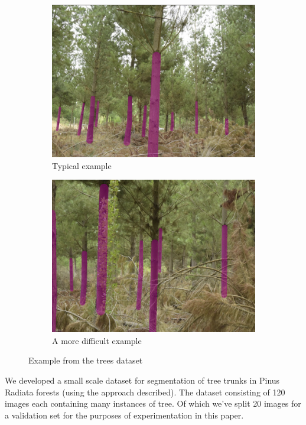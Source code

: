 \documentclass{article}
\begin{document}
\begin{figure}[t]
\centering
\begin{subfigure}{.5\textwidth}
  \centering
  \includegraphics[width=0.9\linewidth]{images/trees_example.png}
  \caption{Typical example}
  \label{fig:sub1}
\end{subfigure}%
\begin{subfigure}{.5\textwidth}
  \centering
  \includegraphics[width=.9\linewidth]{images/trees_example_hard.png}
  \caption{A more difficult example}
  \label{fig:sub2}
\end{subfigure}

\caption{Example from the trees dataset}
\label{fig:tree}
\end{figure}



We developed a small scale dataset for segmentation of tree trunks in Pinus Radiata forests (using the approach described). The dataset consisting of 120 images each containing many instances of tree. Of which we've split 20 images for a validation set for the purposes of experimentation in this paper. 
\end{document}
